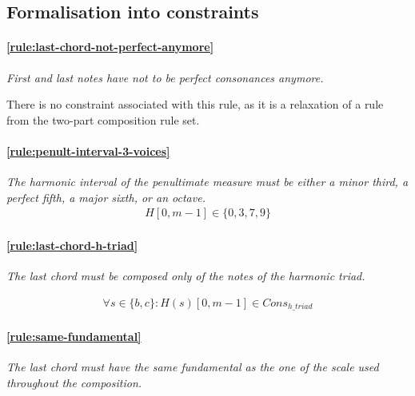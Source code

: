 \subsection{Formalisation into constraints} \label{sec:generalconstraints}
    \paragraph{\hspace{0.6cm}\ref{rule:last-chord-not-perfect-anymore}} \greendots \textit{First and last notes have not to be perfect consonances anymore.}

    There is no constraint associated with this rule, as it is a relaxation of a rule from the two-part composition rule set.

    \paragraph{\hspace{0.6cm}\ref{rule:penult-interval-3-voices}} \greendots \textit{The harmonic interval of the penultimate measure must be either a minor third, a perfect fifth, a major sixth, or an octave.}
    \begin{equation}
        \begin{aligned}
            H[0, m-1] \in \{0, 3, 7, 9\}
        \end{aligned}
    \end{equation}

    \paragraph{\hspace{0.6cm}\ref{rule:last-chord-h-triad}} \textit{The last chord must be composed only of the notes of the harmonic triad.} 
    
    \begin{equation} \begin{aligned}
    \forall s \in \{b, c\} \colon H(s)[0, m-1] \in Cons_{h\_triad}
    \end{aligned} \end{equation}

    \paragraph{\hspace{0.6cm}\ref{rule:same-fundamental}} \textit{The last chord must have the same fundamental as the one of the scale used throughout the composition.}\label{constraint:same-fundamental}

